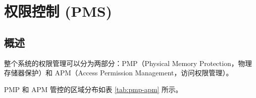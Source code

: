 \documentclass[main\_\_CN.tex]{subfiles}
\begin{document}

\ifglobal
\else
    {\let\clearpage\relax \listoftodos}
    {\let\clearpage\relax \listofdonetodos}
    \tableofcontents
\fi



\hypertarget{permctrl}{}
\chapter{权限控制 (PMS)}
\label{mod:permctrl}

\section{概述}


\chipname{} 整个系统的权限管理可以分为两部分：PMP（Physical Memory Protection，物理存储器保护）和 APM（Access Permission Management，访问权限管理）。

PMP 和 APM 管控的区域分布如表 \ref{tab:pmp-apm} 所示。
\end{document}
